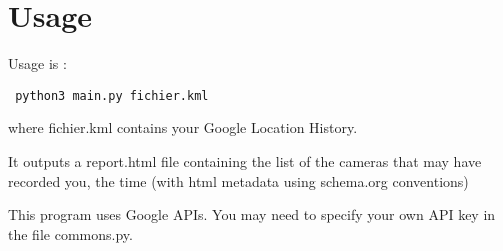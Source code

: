 \documentclass[a4paper]{scrartcl}
\begin{document}
\section{Usage}

Usage is : \begin{verbatim} python3 main.py fichier.kml\end{verbatim} where fichier.kml contains your Google Location History.

It outputs a report.html file containing the list of the cameras that may have recorded you, the time (with html metadata using schema.org conventions)

This program uses Google APIs. You may need to specify your own API key in the file commons.py.
\end{document}
